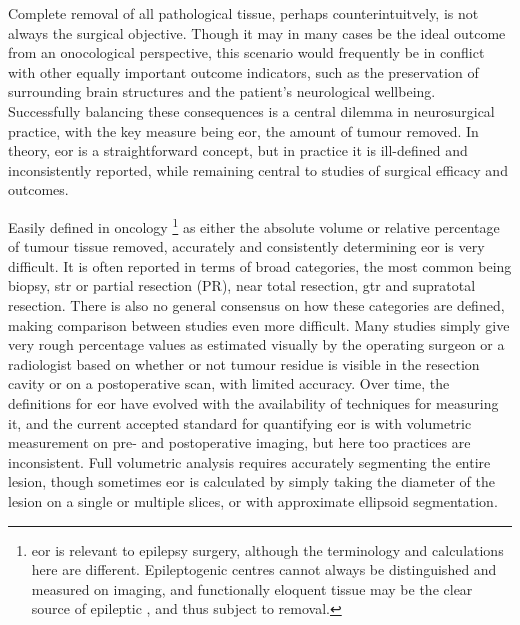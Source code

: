 Complete removal of all pathological tissue, perhaps counterintuitvely, is not always the surgical objective.
Though it may in many cases be the ideal outcome from an onocological perspective, this scenario would frequently be in conflict with other equally important outcome indicators, such as the preservation of surrounding brain structures and the patient's neurological wellbeing.
Successfully balancing these consequences is a central dilemma in neurosurgical practice, with the key measure being \gls{eor}, the amount of tumour removed.
In theory, \gls{eor} is a straightforward concept, but in practice it is ill-defined and inconsistently reported, while remaining central to studies of surgical efficacy and outcomes.

Easily defined in oncology%
\footnote[2]{\gls{eor} is relevant to epilepsy surgery, although the terminology and calculations here are different. Epileptogenic centres cannot always be distinguished and measured on imaging, and functionally eloquent tissue may be the clear source of epileptic , and thus subject to removal.}
as either the absolute volume or relative percentage of tumour tissue removed, accurately and consistently determining \gls{eor} is very difficult.
It is often reported in terms of broad categories, the most common being biopsy, \gls{str} or partial resection (PR), near total resection, \gls{gtr} and supratotal resection\autocite{Wykes2021,Karschnia2021}.
There is also no general consensus on how these categories are defined, making comparison between studies even more difficult\autocite{Karschnia2021}.
Many studies simply give very rough percentage values as estimated visually by the operating surgeon or a radiologist based on whether or not tumour residue is visible in the resection cavity or on a postoperative scan, with limited accuracy\autocite{Sanai2008,Martino2013,Lau2018,Sezer2020}.
Over time, the definitions for \gls{eor} have evolved with the availability of techniques for measuring it, and the current accepted standard for quantifying \gls{eor} is with volumetric measurement on pre- and postoperative imaging\autocite{Rincon-Torroella2019}, but here too practices are inconsistent\autocite{Wykes2021}.
Full volumetric analysis requires accurately segmenting the entire lesion, though sometimes \gls{eor} is calculated by simply taking the diameter of the lesion on a single or multiple slices, or with approximate ellipsoid segmentation\autocite{Sanai2008,Albuquerque2021}.

